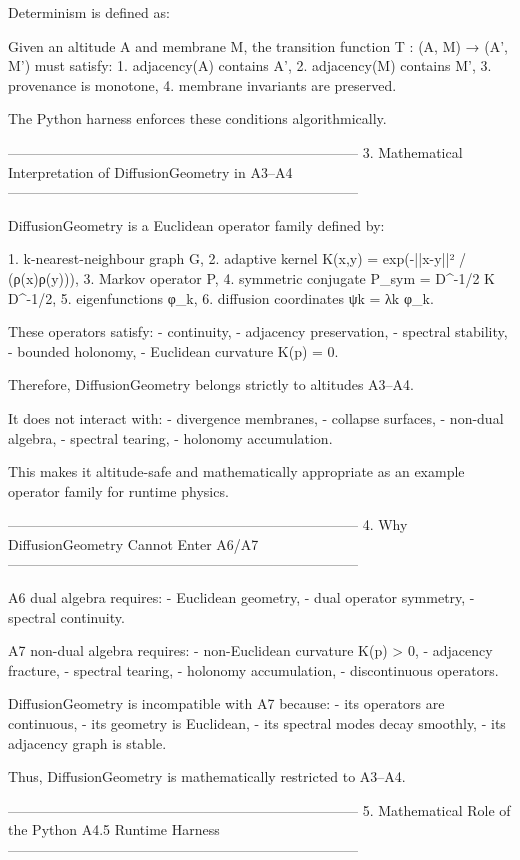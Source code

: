 Determinism is defined as:

Given an altitude A and membrane M, the transition function
    T : (A, M) → (A', M')
must satisfy:
1. adjacency(A) contains A',
2. adjacency(M) contains M',
3. provenance is monotone,
4. membrane invariants are preserved.

The Python harness enforces these conditions algorithmically.

---------------------------------------------------------------------------
3. Mathematical Interpretation of DiffusionGeometry in A3–A4
---------------------------------------------------------------------------

DiffusionGeometry is a Euclidean operator family defined by:

1. k-nearest-neighbour graph G,
2. adaptive kernel K(x,y) = exp(-||x-y||² / (ρ(x)ρ(y))),
3. Markov operator P,
4. symmetric conjugate P_sym = D^{-1/2} K D^{-1/2},
5. eigenfunctions φ_k,
6. diffusion coordinates ψk = λk φ_k.

These operators satisfy:
- continuity,
- adjacency preservation,
- spectral stability,
- bounded holonomy,
- Euclidean curvature K(p) = 0.

Therefore, DiffusionGeometry belongs strictly to altitudes A3–A4.

It does not interact with:
- divergence membranes,
- collapse surfaces,
- non-dual algebra,
- spectral tearing,
- holonomy accumulation.

This makes it altitude-safe and mathematically appropriate as an example operator
family for runtime physics.

---------------------------------------------------------------------------
4. Why DiffusionGeometry Cannot Enter A6/A7
---------------------------------------------------------------------------

A6 dual algebra requires:
- Euclidean geometry,
- dual operator symmetry,
- spectral continuity.

A7 non-dual algebra requires:
- non-Euclidean curvature K(p) > 0,
- adjacency fracture,
- spectral tearing,
- holonomy accumulation,
- discontinuous operators.

DiffusionGeometry is incompatible with A7 because:
- its operators are continuous,
- its geometry is Euclidean,
- its spectral modes decay smoothly,
- its adjacency graph is stable.

Thus, DiffusionGeometry is mathematically restricted to A3–A4.

---------------------------------------------------------------------------
5. Mathematical Role of the Python A4.5 Runtime Harness
---------------------------------------------------------------------------

